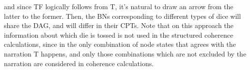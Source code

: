 \documentclass[
  10pt,
]{scrartcl}
\newcommand{\s}[1]{\textsf{#1}}
\begin{document}
\noindent and since \s{TF} logically follows from \s{T}, it's natural to draw an arrow from the latter to the former. Then, the BNs corresponding to different types of dice will share the DAG, and will differ in their CPTs. Note that on this approach the information about which die is tossed is not used in the structured coherence calculations, since in the only combination of node states that agrees with the narration \s{T} happens, and only those combinations which are not excluded by the narration are considered in coherence calculations.

\begin{figure}[H]
\end{figure}
\end{document}
